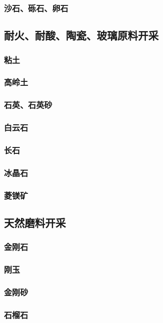 \documentclass[UTF8]{../../ApplicationUniverse}
\begin{document}
        \subsubsection{沙石、砾石、卵石}
    \subsection{耐火、耐酸、陶瓷、玻璃原料开采}
        \subsubsection{粘土}
        \subsubsection{高岭土}
        \subsubsection{石英、石英砂}
        \subsubsection{白云石}
        \subsubsection{长石}
        \subsubsection{冰晶石}
        \subsubsection{菱镁矿}
    \subsection{天然磨料开采}
        \subsubsection{金刚石}
        \subsubsection{刚玉}
        \subsubsection{金刚砂}
        \subsubsection{石榴石}
\end{document}
